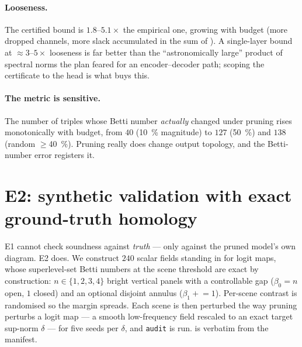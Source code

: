 \documentclass[11pt]{article}
\newcommand{\code}[1]{\texttt{\small #1}}
\newcommand{\Betti}{\beta}
\theoremstyle{definition}
\theoremstyle{plain}
\begin{document}
\paragraph{Looseness.} The certified bound is $1.8$--$5.1\times$ the empirical
one, growing with budget (more dropped channels, more slack accumulated in the
sum of ). A single-layer bound at $\approx 3$--$5\times$
looseness is far better than the ``astronomically large'' product of spectral
norms the plan feared for an encoder--decoder path; scoping the certificate to
the head is what buys this.

\paragraph{The metric is sensitive.} The number of triples whose Betti number
\emph{actually} changed under pruning rises monotonically with budget, from $40$
(\SI{10}{\percent} magnitude) to $127$ (\SI{50}{\percent}) and $138$ (random
$\ge$\SI{40}{\percent}). Pruning really does change output topology, and the
Betti-number error registers it.

\section{E2: synthetic validation with exact ground-truth homology}
\label{sec:e2}

E1 cannot check soundness against \emph{truth} --- only against the pruned
model's own diagram. E2 does. We construct $240$ scalar fields standing in for
logit maps, whose superlevel-set Betti numbers at the scene threshold are exact
by construction: $n \in \{1,2,3,4\}$ bright vertical panels with a controllable
gap ($\Betti_0 = n$ open, $1$ closed) and an optional disjoint annulus
($\Betti_1 \mathrel{+}= 1$). Per-scene contrast is randomised so the margin
spreads. Each scene is then perturbed the way pruning perturbs a logit map --- a
smooth low-frequency field rescaled to an exact target sup-norm $\delta$ --- for
five seeds per $\delta$, and \code{audit} is run.  is verbatim from
the manifest.
\end{document}
